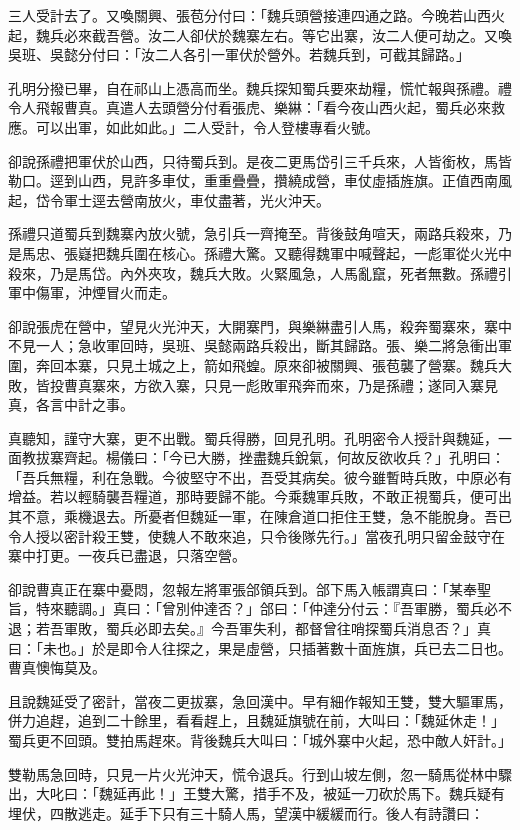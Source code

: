 三人受計去了。又喚關興、張苞分付曰：「魏兵頭營接連四通之路。今晚若山西火起，魏兵必來截吾營。汝二人卻伏於魏寨左右。等它出寨，汝二人便可劫之。又喚吳班、吳懿分付曰：「汝二人各引一軍伏於營外。若魏兵到，可截其歸路。」

孔明分撥已畢，自在祁山上憑高而坐。魏兵探知蜀兵要來劫糧，慌忙報與孫禮。禮令人飛報曹真。真遣人去頭營分付看張虎、樂綝：「看今夜山西火起，蜀兵必來救應。可以出軍，如此如此。」二人受計，令人登樓專看火號。

卻說孫禮把軍伏於山西，只待蜀兵到。是夜二更馬岱引三千兵來，人皆銜枚，馬皆勒口。逕到山西，見許多車仗，重重疊疊，攢繞成營，車仗虛插旌旗。正值西南風起，岱令軍士逕去營南放火，車仗盡著，光火沖天。

孫禮只道蜀兵到魏寨內放火號，急引兵一齊掩至。背後鼓角喧天，兩路兵殺來，乃是馬忠、張嶷把魏兵圍在核心。孫禮大驚。又聽得魏軍中喊聲起，一彪軍從火光中殺來，乃是馬岱。內外夾攻，魏兵大敗。火緊風急，人馬亂竄，死者無數。孫禮引軍中傷軍，沖煙冒火而走。

卻說張虎在營中，望見火光沖天，大開寨門，與樂綝盡引人馬，殺奔蜀寨來，寨中不見一人；急收軍回時，吳班、吳懿兩路兵殺出，斷其歸路。張、樂二將急衝出軍圍，奔回本寨，只見土城之上，箭如飛蝗。原來卻被關興、張苞襲了營寨。魏兵大敗，皆投曹真寨來，方欲入寨，只見一彪敗軍飛奔而來，乃是孫禮；遂同入寨見真，各言中計之事。

真聽知，謹守大寨，更不出戰。蜀兵得勝，回見孔明。孔明密令人授計與魏延，一面教拔寨齊起。楊儀曰：「今已大勝，挫盡魏兵銳氣，何故反欲收兵？」孔明曰：「吾兵無糧，利在急戰。今彼堅守不出，吾受其病矣。彼今雖暫時兵敗，中原必有增益。若以輕騎襲吾糧道，那時要歸不能。今乘魏軍兵敗，不敢正視蜀兵，便可出其不意，乘機退去。所憂者但魏延一軍，在陳倉道口拒住王雙，急不能脫身。吾已令人授以密計殺王雙，使魏人不敢來追，只令後隊先行。」當夜孔明只留金鼓守在寨中打更。一夜兵已盡退，只落空營。

卻說曹真正在寨中憂悶，忽報左將軍張郃領兵到。郃下馬入帳謂真曰：「某奉聖旨，特來聽調。」真曰：「曾別仲達否？」郃曰：「仲達分付云：『吾軍勝，蜀兵必不退；若吾軍敗，蜀兵必即去矣。』今吾軍失利，都督曾往哨探蜀兵消息否？」真曰：「未也。」於是即令人往探之，果是虛營，只插著數十面旌旗，兵已去二日也。曹真懊悔莫及。

且說魏延受了密計，當夜二更拔寨，急回漢中。早有細作報知王雙，雙大驅軍馬，併力追趕，追到二十餘里，看看趕上，且魏延旗號在前，大叫曰：「魏延休走！」蜀兵更不回頭。雙拍馬趕來。背後魏兵大叫曰：「城外寨中火起，恐中敵人奸計。」

雙勒馬急回時，只見一片火光沖天，慌令退兵。行到山坡左側，忽一騎馬從林中驟出，大叱曰：「魏延再此！」王雙大驚，措手不及，被延一刀砍於馬下。魏兵疑有埋伏，四散逃走。延手下只有三十騎人馬，望漢中緩緩而行。後人有詩讚曰：

